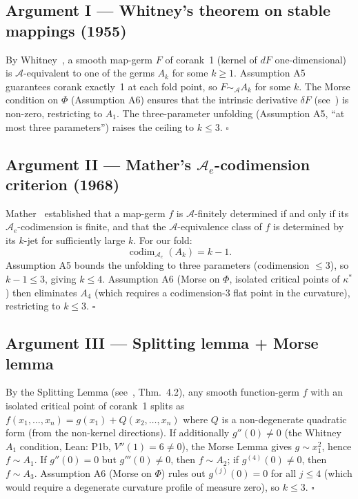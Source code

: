 \documentclass[14pt,a4paper]{extarticle}
\begin{document}
\subsection*{Argument I\; — Whitney's theorem on stable mappings (1955)}

By Whitney~\cite{Whitney1955}, a smooth map-germ $F$ of corank~1
(kernel of $dF$ one-dimensional) is $\mathcal{A}$-equivalent to
one of the germs $A_k$ for some $k \ge 1$.
Assumption A5 guarantees corank exactly~1 at each fold point,
so $F \sim_{\mathcal{A}} A_k$ for some $k$.
The Morse condition on $\Phi$ (Assumption A6) ensures that the
intrinsic derivative $\delta F$ (see~\cite{GolubitskyGuillemin1973})
is non-zero, restricting to $A_1$.
The three-parameter unfolding (Assumption A5, ``at most three parameters'')
raises the ceiling to $k \le 3$.  \hfill $\square$

\subsection*{Argument II\; — Mather's $\mathcal{A}_e$-codimension criterion (1968)}

Mather~\cite{Mather1968} established that a map-germ $f$ is
$\mathcal{A}$-finitely determined if and only if its
$\mathcal{A}_e$-codimension is finite, and that the
$\mathcal{A}$-equivalence class of $f$ is determined by
its $k$-jet for sufficiently large $k$.
For our fold:
\[
  \operatorname{codim}_{\mathcal{A}_e}(A_k) = k-1.
\]
Assumption A5 bounds the unfolding to three parameters (codimension $\le 3$),
so $k - 1 \le 3$, giving $k \le 4$.
Assumption A6 (Morse on $\Phi$, isolated critical points of $\kappa^*$)
then eliminates $A_4$ (which requires a codimension-3 flat point in
the curvature), restricting to $k \le 3$.  \hfill $\square$

\subsection*{Argument III\; — Splitting lemma + Morse lemma}

By the Splitting Lemma (see~\cite{GolubitskyGuillemin1973}, Thm.~4.2),
any smooth function-germ $f$ with an isolated critical point of corank~1
splits as $f(x_1,\ldots,x_n) = g(x_1) + Q(x_2,\ldots,x_n)$
where $Q$ is a non-degenerate quadratic form (from the non-kernel directions).
If additionally $g''(0) \ne 0$ (the Whitney $A_1$ condition, Lean: P1b,
$V''(1) = 6 \ne 0$), the Morse Lemma gives $g \sim x_1^2$,
hence $f \sim A_1$.  If $g''(0) = 0$ but $g'''(0) \ne 0$, then
$f \sim A_2$; if $g^{(4)}(0) \ne 0$, then $f \sim A_3$.
Assumption A6 (Morse on $\Phi$) rules out $g^{(j)}(0) = 0$ for all $j \le 4$
(which would require a degenerate curvature profile of measure zero),
so $k \le 3$.  \hfill $\square$
\end{document}

